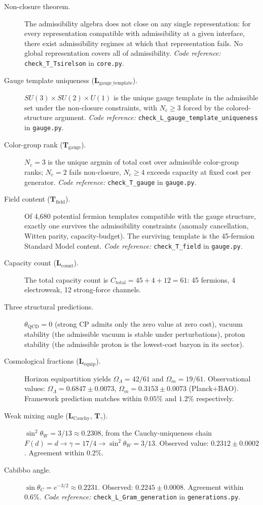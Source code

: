 \documentclass[11pt]{article}
\newcommand{\coderef}[2]{\smallskip\noindent\textit{Code reference:} \texttt{#1} in \texttt{#2}.}
\begin{document}
\begin{description}
    \item[Non-closure theorem.] The admissibility algebra does not close on any single representation: for every representation compatible with admissibility at a given interface, there exist admissibility regimes at which that representation fails. No global representation covers all of admissibility. \coderef{check\_T\_Tsirelson}{core.py}
    \item[Gauge template uniqueness ($\mathbf{L}_{\mathrm{gauge\_template}}$).] $SU(3) \times SU(2) \times U(1)$ is the unique gauge template in the admissible set under the non-closure constraints, with $N_c \geq 3$ forced by the colored-structure argument. \coderef{check\_L\_gauge\_template\_uniqueness}{gauge.py}
    \item[Color-group rank ($\mathbf{T}_{\mathrm{gauge}}$).] $N_c = 3$ is the unique argmin of total cost over admissible color-group ranks; $N_c = 2$ fails non-closure, $N_c \geq 4$ exceeds capacity at fixed cost per generator. \coderef{check\_T\_gauge}{gauge.py}
    \item[Field content ($\mathbf{T}_{\mathrm{field}}$).] Of 4,680 potential fermion templates compatible with the gauge structure, exactly one survives the admissibility constraints (anomaly cancellation, Witten parity, capacity-budget). The surviving template is the 45-fermion Standard Model content. \coderef{check\_T\_field}{gauge.py}
    \item[Capacity count ($\mathbf{L}_{\mathrm{count}}$).] The total capacity count is $C_{\mathrm{total}} = 45 + 4 + 12 = 61$: 45 fermions, 4 electroweak, 12 strong-force channels.
    \item[Three structural predictions.] $\theta_{\mathrm{QCD}} = 0$ (strong CP admits only the zero value at zero cost), vacuum stability (the admissible vacuum is stable under perturbations), proton stability (the admissible proton is the lowest-cost baryon in its sector).
    \item[Cosmological fractions ($\mathbf{L}_{\mathrm{equip}}$).] Horizon equipartition yields $\Omega_\Lambda = 42/61$ and $\Omega_m = 19/61$. Observational values: $\Omega_\Lambda = 0.6847 \pm 0.0073$, $\Omega_m = 0.3153 \pm 0.0073$ (Planck+BAO). Framework prediction matches within $0.05\%$ and $1.2\%$ respectively.
    \item[Weak mixing angle ($\mathbf{L}_{\mathrm{Cauchy}}$, $\mathbf{T}_{\gamma}$).] $\sin^2\theta_W = 3/13 \approx 0.2308$, from the Cauchy-uniqueness chain $F(d) = d \to \gamma = 17/4 \to \sin^2\theta_W = 3/13$. Observed value: $0.2312 \pm 0.0002$. Agreement within $0.2\%$.
    \item[Cabibbo angle.] $\sin\theta_C = e^{-3/2} \approx 0.2231$. Observed: $0.2245 \pm 0.0008$. Agreement within $0.6\%$. \coderef{check\_L\_Gram\_generation}{generations.py}
\end{description}
\end{document}
